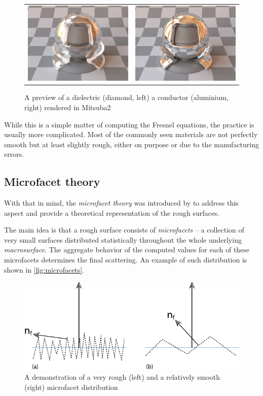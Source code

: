 \begin{figure}[h]
	\centering
	\begin{tabular}{cc}
		\includegraphics[width=.4\linewidth]{img/dielectric_diamond.jpg}
		&
		\includegraphics[width=.4\linewidth]{img/conductor_aluminium.jpg}
	\end{tabular}
	\caption{A preview of a dielectric (diamond, left) a  conductor (aluminium, right) rendered in Mitsuba2~\cite{mitsubaWeb}}
	\label{fig:compare_dielectric_conductor}
\end{figure}

While this is a simple matter of computing the Fresnel equations, the practice is usually more complicated. Most of the commonly seen materials are not perfectly smooth but at least slightly rough, either on purpose or due to the manufacturing errors.

\subsection{Microfacet theory}
With that in mind, the \emph{microfacet theory} was introduced by \citet{cook1982reflectance} to address this aspect and provide a theoretical representation of the rough surfaces.

The main idea is that a rough surface consists of \emph{microfacets} -- a collection of very small surfaces distributed statistically throughout the whole underlying \emph{macrosurface}. The aggregate behavior of the computed values for each of these microfacets determines the final scattering. An example of such distribution is shown in \autoref{fig:microfacets}.

\begin{figure}[h]
	\centering
	\includegraphics[width=.8\linewidth]{img/microfacets.pdf}
	\caption{A demonstration of a very rough (left) and a relatively smooth (right) microfacet distribution~\cite{pharr2016physically}}
	\label{fig:microfacets}
\end{figure}

